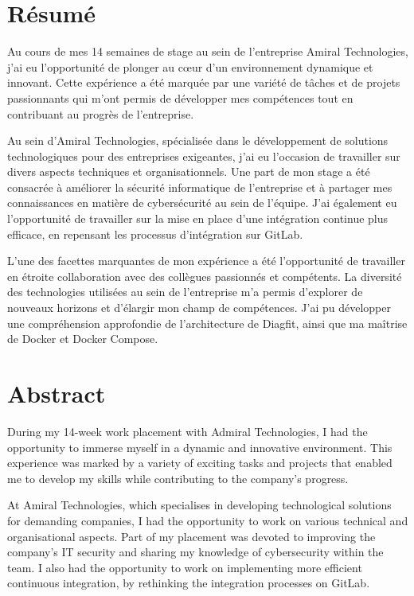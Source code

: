 \section*{Résumé}
Au cours de mes 14 semaines de stage au sein de l'entreprise Amiral Technologies, j'ai eu l'opportunité de plonger au cœur d'un environnement dynamique et innovant.
Cette expérience a été marquée par une variété de tâches et de projets passionnants qui m'ont permis de développer mes compétences tout en contribuant au progrès de l'entreprise.

Au sein d'Amiral Technologies, spécialisée dans le développement de solutions technologiques pour des entreprises exigeantes, j'ai eu l'occasion de travailler sur divers aspects techniques et organisationnels.
Une part de mon stage a été consacrée à améliorer la sécurité informatique de l'entreprise et à partager mes connaissances en matière de cybersécurité au sein de l'équipe.
J'ai également eu l'opportunité de travailler sur la mise en place d'une intégration continue plus efficace, en repensant les processus d'intégration sur GitLab.

L'une des facettes marquantes de mon expérience a été l'opportunité de travailler en étroite collaboration avec des collègues passionnés et compétents.
La diversité des technologies utilisées au sein de l'entreprise m'a permis d'explorer de nouveaux horizons et d'élargir mon champ de compétences.
J'ai pu développer une compréhension approfondie de l'architecture de Diagfit, ainsi que ma maîtrise de Docker et Docker Compose.

\section*{Abstract}
During my 14-week work placement with Admiral Technologies, I had the opportunity to immerse myself in a dynamic and innovative environment.
This experience was marked by a variety of exciting tasks and projects that enabled me to develop my skills while contributing to the company's progress.

At Amiral Technologies, which specialises in developing technological solutions for demanding companies, I had the opportunity to work on various technical and organisational aspects.
Part of my placement was devoted to improving the company's IT security and sharing my knowledge of cybersecurity within the team.
I also had the opportunity to work on implementing more efficient continuous integration, by rethinking the integration processes on GitLab.

